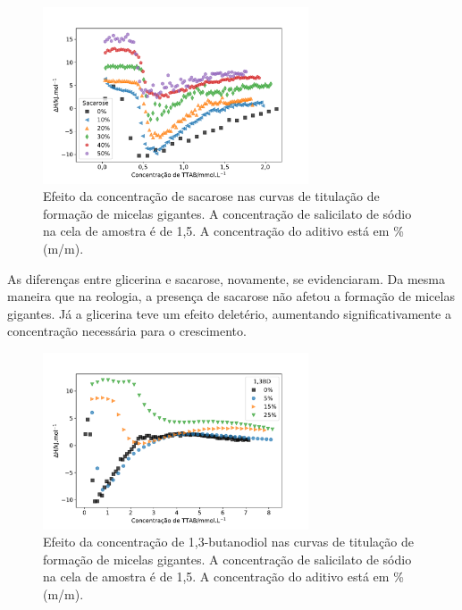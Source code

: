 			\begin{figure}[h]
				\centering
				\includegraphics[width=0.7\textwidth]{imagens/itc/ITC_MG_sac}
				\caption{Efeito da concentração de sacarose nas curvas de titulação de formação de micelas gigantes. A concentração de salicilato de sódio na cela de amostra é de 1,5\mM. A concentração do aditivo está em \% (m/m).}
				\label{fig:itc_mg_sacarose}
			\end{figure}
			
			As diferenças entre glicerina e sacarose, novamente, se evidenciaram. Da mesma maneira que na reologia, a presença de sacarose não afetou a formação de micelas gigantes. Já a glicerina teve um efeito deletério, aumentando significativamente a concentração necessária para o crescimento.
						
			\begin{figure}[h]
				\centering
				\includegraphics[width=0.7\textwidth]{imagens/itc/ITC_MG_13BD}
				\caption{Efeito da concentração de 1,3-butanodiol nas curvas de titulação de formação de micelas gigantes. A concentração de salicilato de sódio na cela de amostra é de 1,5\mM. A concentração do aditivo está em \% (m/m).}
				\label{fig:itc_mg_13bd}
			\end{figure}
			
